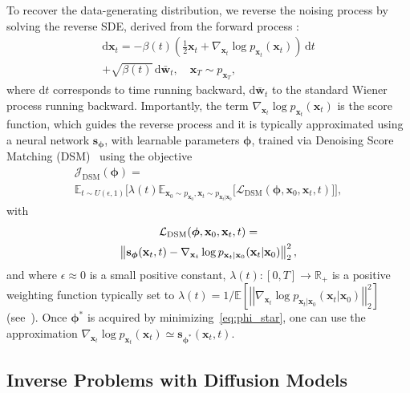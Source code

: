 To recover the data-generating distribution, we reverse the noising process by solving the reverse SDE, derived from the forward process \cite{anderson_1982}:
\begin{multline*}
\mathrm{d}\mathbf{x}_t = - \beta(t) \left( \frac{1}{2} \mathbf{x}_t + \nabla_{\mathbf{x}_t} \log p_{\mathbf{x}_{t}}(\mathbf{x}_t) \right) \, \mathrm{d}t   \\ + \sqrt{\beta(t)} \, \mathrm{d}\bar{\mathbf{w}}_t, \quad \mathbf{x}_T \sim p_{\mathbf{x}_T},
\end{multline*}
where $\mathrm{d}t$ corresponds to time running backward, $\mathrm{d}\bar{\mathbf{w}}_t$ to the standard Wiener process running backward. Importantly, the term $ \nabla_{\mathbf{x}_t} \log p_{\mathbf{x}_{t}}(\mathbf{x}_t) $ is the score function, which guides the reverse process and it is typically approximated using a neural network $ \mathbf{s}_{\boldsymbol{\phi}}$, with learnable parameters $\boldsymbol{\phi}$, trained via Denoising Score Matching (DSM)~\cite{vincent2011} using the objective
\begin{multline}\label{eq:phi_star}
    \mathcal{J}_{\text{DSM}}(\boldsymbol{\phi}) =\\  \mathbb{E}_{t\sim U(\epsilon, 1)}\Big[ \lambda(t)  \mathbb{E}_{ \mathbf{x}_0\sim  p_{\mathbf{x}_0}, \mathbf{x}_t \sim p_{\mathbf{x}_t\vert\mathbf{x}_0}}\Big[ \mathcal{L}_{\text{DSM}}(\boldsymbol{\phi},  \mathbf{x}_0, \mathbf{x}_t, t)\Big]\Big], 
\end{multline}
with 
\begin{multline*}
\mathcal{L}_{\text{DSM}}(\boldsymbol{\phi}, \mathbf{x}_0, \mathbf{x}_t, t) = \\  \left\lVert \mathbf{s}_{\boldsymbol{\phi}}(\mathbf{x}_t, t) 
    -  \nabla_{\mathbf{x}_t} \log p_{\mathbf{x}_t\vert\mathbf{x}_0}(\mathbf{x}_t\vert\mathbf{x}_0) \right\rVert_2^2,
\end{multline*}
and where $\epsilon \approx 0$ is a small positive constant, $\lambda(t) :[0,T]\to\mathbb{R}_+$ is a positive weighting function typically set to $\lambda(t) = 1/ \mathbb{E}\left[\left\vert\left\vert\nabla_{\mathbf{x}_t} \log p_{\mathbf{x}_t\vert\mathbf{x}_0}(\mathbf{x}_t|\mathbf{x}_0) \right\vert\right\vert_2^2\right]$ (see~\citet[Section 3.3]{song2021scorebased}). Once $\boldsymbol{\phi}^{*}$ is acquired by minimizing~\eqref{eq:phi_star}, one can use the approximation $\nabla_{\mathbf{x}_t} \log p_{\mathbf{x}_t}(\mathbf{x}_t) \simeq \mathbf{s}_{\boldsymbol{\phi}^*}(\mathbf{x}_t, t)$. 

\subsection{Inverse Problems with Diffusion Models}
\label{sec-diffusion-posterior-sampling}

